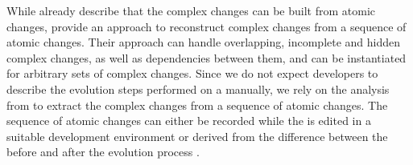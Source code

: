 While \textcite{herrmannsdoerfer_extensive_2011} already describe that the complex changes can be built from atomic changes, \cite{khelladi_change_2018} provide an approach to reconstruct complex changes from a sequence of atomic changes.
Their approach can handle overlapping, incomplete and hidden complex changes, as well as dependencies between them, and can be instantiated for arbitrary sets of complex changes.
Since we do not expect developers to describe the evolution steps performed on a \metamodel manually, we rely on the analysis from \cite{khelladi_change_2018} to extract the complex changes from a sequence of atomic changes.
The sequence of atomic changes can either be recorded while the \metamodel is edited in a suitable development environment or derived from the difference between the \metamodel before and after the evolution process \autocite{wittler_derivation_2021}.

